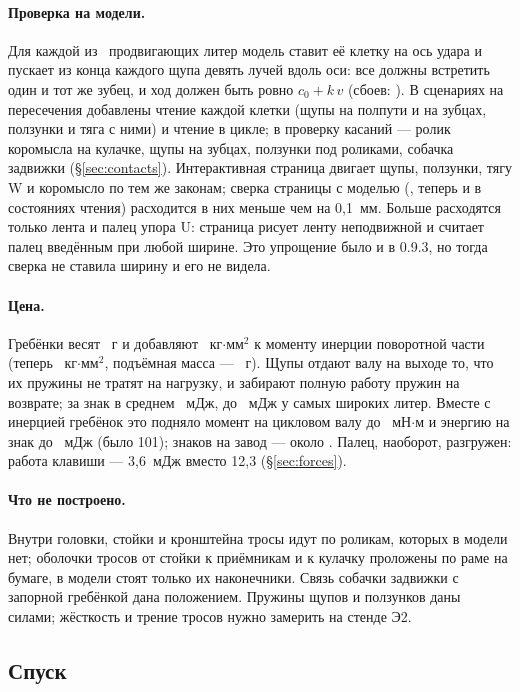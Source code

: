 \paragraph{Проверка на модели.} Для каждой из \rdn\ продвигающих литер модель ставит её клетку на ось удара и пускает из конца каждого щупа девять лучей вдоль оси: все должны встретить один и тот же зубец, и ход должен быть ровно $c_0 + k\,v$ (сбоев: \rdbad). В сценариях на пересечения добавлены чтение каждой клетки (щупы на полпути и на зубцах, ползунки и тяга с ними) и чтение в цикле; в проверку касаний — ролик коромысла на кулачке, щупы на зубцах, ползунки под роликами, собачка задвижки (\S\ref{sec:contacts}). Интерактивная страница двигает щупы, ползунки, тягу W и коромысло по тем же законам; сверка страницы с моделью (, теперь и в состояниях чтения) расходится в них меньше чем на 0,1~мм. Больше расходятся только лента и палец упора U: страница рисует ленту неподвижной и считает палец введённым при любой ширине. Это упрощение было и в 0.9.3, но тогда сверка не ставила ширину и его не видела.

\paragraph{Цена.} Гребёнки весят \rdmass~г и добавляют \rdI~кг$\cdot$мм$^2$ к моменту инерции поворотной части (теперь \rdIrot~кг$\cdot$мм$^2$, подъёмная масса — \rdmlift~г). Щупы отдают валу на выходе то, что их пружины не тратят на нагрузку, и забирают полную работу пружин на возврате; за знак в среднем \rdEavg~мДж, до \rdEmax~мДж у самых широких литер. Вместе с инерцией гребёнок это подняло момент на цикловом валу до \mtauC~мН$\cdot$м и энергию на знак до \mEchar~мДж (было 101); знаков на завод — около \mcharswind. Палец, наоборот, разгружен: работа клавиши — 3,6~мДж вместо 12,3 (\S\ref{sec:forces}).

\paragraph{Что не построено.} Внутри головки, стойки и кронштейна тросы идут по роликам, которых в модели нет; оболочки тросов от стойки к приёмникам и к кулачку проложены по раме на бумаге, в модели стоят только их наконечники. Связь собачки задвижки с запорной гребёнкой дана положением. Пружины щупов и ползунков даны силами; жёсткость и трение тросов нужно замерить на стенде Э2.

\subsection{Спуск}

